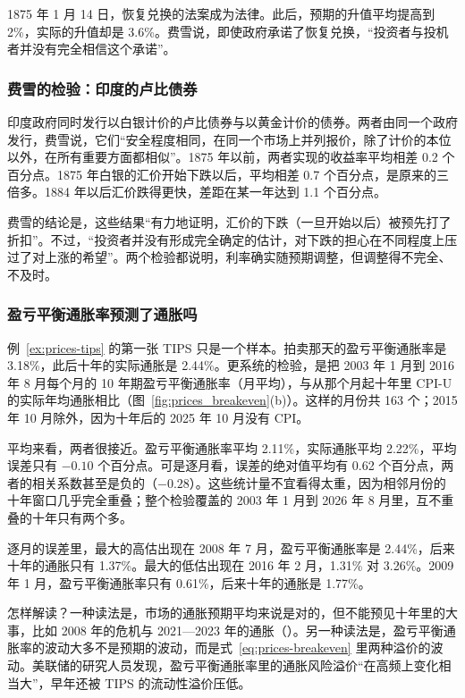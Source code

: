 1875 年 1 月 14 日，恢复兑换的法案成为法律。此后，预期的升值平均提高到 2\%，实际的升值却是 3.6\%。费雪说，即使政府承诺了恢复兑换，“投资者与投机者并没有完全相信这个承诺”\cite{fisher1896}。

\subsubsection{费雪的检验：印度的卢比债券}
印度政府同时发行以白银计价的卢比债券与以黄金计价的债券。两者由同一个政府发行，费雪说，它们“安全程度相同，在同一个市场上并列报价，除了计价的本位以外，在所有重要方面都相似”。1875 年以前，两者实现的收益率平均相差 0.2 个百分点。1875 年白银的汇价开始下跌以后，平均相差 0.7 个百分点，是原来的三倍多。1884 年以后汇价跌得更快，差距在某一年达到 1.1 个百分点\cite{fisher1896}。

费雪的结论是，这些结果“有力地证明，汇价的下跌（一旦开始以后）被预先打了折扣”。不过，“投资者并没有形成完全确定的估计，对下跌的担心在不同程度上压过了对上涨的希望”\cite{fisher1896}。两个检验都说明，利率确实随预期调整，但调整得不完全、不及时。

\subsubsection{盈亏平衡通胀率预测了通胀吗}
例~\ref{ex:prices-tips} 的第一张 TIPS 只是一个样本。拍卖那天的盈亏平衡通胀率是 3.18\%，此后十年的实际通胀是 2.44\%。更系统的检验，是把 2003 年 1 月到 2016 年 8 月每个月的 10 年期盈亏平衡通胀率（月平均），与从那个月起十年里 CPI-U 的实际年均通胀相比（图~\ref{fig:prices_breakeven}(b)）。这样的月份共 163 个；2015 年 10 月除外，因为十年后的 2025 年 10 月没有 CPI。

平均来看，两者很接近。盈亏平衡通胀率平均 2.11\%，实际通胀平均 2.22\%，平均误差只有 $-0.10$ 个百分点。可是逐月看，误差的绝对值平均有 0.62 个百分点，两者的相关系数甚至是负的（$-0.28$）。这些统计量不宜看得太重，因为相邻月份的十年窗口几乎完全重叠；整个检验覆盖的 2003 年 1 月到 2026 年 8 月里，互不重叠的十年只有两个多。

逐月的误差里，最大的高估出现在 2008 年 7 月，盈亏平衡通胀率是 2.44\%，后来十年的通胀只有 1.37\%。最大的低估出现在 2016 年 2 月，1.31\% 对 3.26\%。2009 年 1 月，盈亏平衡通胀率只有 0.61\%，后来十年的通胀是 1.77\%。

怎样解读？一种读法是，市场的通胀预期平均来说是对的，但不能预见十年里的大事，比如 2008 年的危机与 2021—2023 年的通胀（）。另一种读法是，盈亏平衡通胀率的波动大多不是预期的波动，而是式~\eqref{eq:prices-breakeven} 里两种溢价的波动。美联储的研究人员发现，盈亏平衡通胀率里的通胀风险溢价“在高频上变化相当大”，早年还被 TIPS 的流动性溢价压低\cite{gsw2008}。

